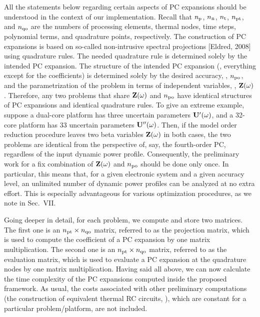 \begin{authors}
All the statements below regarding certain aspects of PC expansions should be understood in the context of our implementation.
Recall that ${n_\text{p}}$, ${n_\text{n}}$, ${n_\text{t}}$, ${n_\text{pt}}$, and ${n_\text{qo}}$ are the numbers of processing elements, thermal nodes, time steps, polynomial terms, and quadrature points, respectively.
The construction of PC expansions is based on so-called non-intrusive spectral projections [Eldred, 2008] using quadrature rules.
The needed quadrature rule is determined solely by the intended PC expansion.
The structure of the intended PC expansion (\ie, everything except for the coefficients) is determined solely by the desired accuracy, \ie, ${n_\text{po}}$, and the parametrization of the problem in terms of independent variables, \ie, $\mathbf{Z}(\omega)$.
Therefore, any two problems that share $\mathbf{Z}(\omega)$ and ${n_\text{po}}$ have identical structures of PC expansions and identical quadrature rules.
To give an extreme example, suppose a dual-core platform has three uncertain parameters $\mathbf{U}'(\omega)$, and a 32-core platform has 33 uncertain parameters $\mathbf{U}''(\omega)$.
Then, if the model order reduction procedure leaves two beta variables $\mathbf{Z}(\omega)$ in both cases, the two problems are identical from the perspective of, say, the fourth-order PC, regardless of the input dynamic power profile.
Consequently, the preliminary work for a fix combination of $\mathbf{Z}(\omega)$ and ${n_\text{po}}$ should be done only once.
In particular, this means that, for a given electronic system and a given accuracy level, an unlimited number of dynamic power profiles can be analyzed at no extra effort.
This is especially advantageous for various optimization procedures, as we note in Sec.~VII.

Going deeper in detail, for each problem, we compute and store two matrices.
The first one is an ${n_\text{pt}} \times {n_\text{qo}}$ matrix, referred to as the projection matrix, which is used to compute the coefficient of a PC expansion by one matrix multiplication.
The second one is an ${n_\text{pt}} \times {n_\text{qo}}$ matrix, referred to as the evaluation matrix, which is used to evaluate a PC expansion at the quadrature nodes by one matrix multiplication.
Having said all above, we can now calculate the time complexity of the PC expansions computed inside the proposed framework.
As usual, the costs associated with other preliminary computations (the construction of equivalent thermal RC circuits, \etc), which are constant for a particular problem/platform, are not included.


\end{authors}

